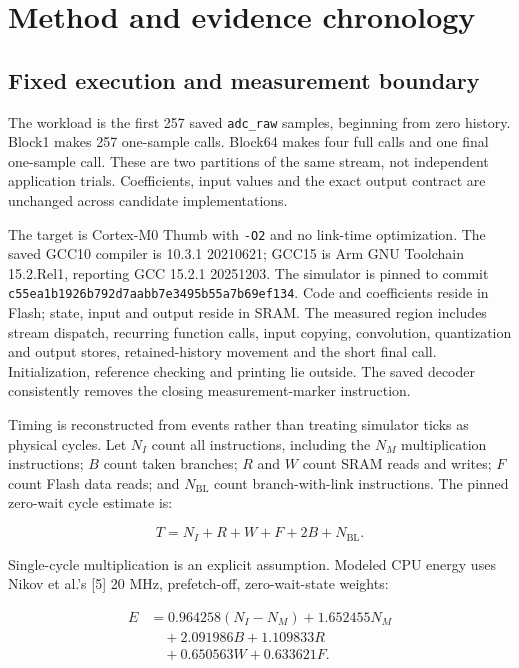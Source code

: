 \documentclass[conference]{IEEEtran}
\begin{document}
\section{Method and evidence chronology}\label{method-and-evidence-chronology}

\subsection{Fixed execution and measurement boundary}\label{fixed-execution-and-measurement-boundary}

The workload is the first 257 saved \texttt{adc\_raw} samples, beginning
from zero history. Block1 makes 257 one-sample calls. Block64 makes four
full calls and one final one-sample call. These are two partitions of
the same stream, not independent application trials. Coefficients, input
values and the exact output contract are unchanged across candidate
implementations.

The target is Cortex-M0 Thumb with \texttt{-O2} and no link-time
optimization. The saved GCC10 compiler is 10.3.1 20210621; GCC15 is Arm
GNU Toolchain 15.2.Rel1, reporting GCC 15.2.1 20251203. The simulator is
pinned to commit \texttt{c55ea1b1926b792d7aabb7e3495b55a7b69ef134}. Code
and coefficients reside in Flash; state, input and output reside in
SRAM. The measured region includes stream dispatch, recurring function
calls, input copying, convolution, quantization and output stores,
retained-history movement and the short final call. Initialization,
reference checking and printing lie outside. The saved decoder
consistently removes the closing measurement-marker instruction.

Timing is reconstructed from events rather than treating simulator ticks
as physical cycles. Let \(N_I\) count all instructions, including the
\(N_M\) multiplication instructions; \(B\) count taken branches; \(R\)
and \(W\) count SRAM reads and writes; \(F\) count Flash data reads; and
\(N_{\mathrm{BL}}\) count branch-with-link instructions. The pinned
zero-wait cycle estimate is:

\[
T = N_I + R + W + F + 2B + N_{\mathrm{BL}}.
\]

Single-cycle multiplication is an explicit assumption. Modeled CPU
energy uses Nikov et al.'s {[}5{]} 20 MHz, prefetch-off, zero-wait-state
weights:

\[
\begin{aligned}
E &= 0.964258(N_I-N_M) + 1.652455N_M\\
  &\quad + 2.091986B + 1.109833R\\
  &\quad + 0.650563W + 0.633621F.
\end{aligned}
\]
\end{document}
